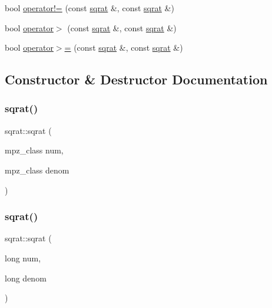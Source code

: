 \begin{DoxyCompactItemize}
\item 
bool \mbox{\hyperlink{classsqrat_ae100dba56606c0cfbbe45c04ae9f462a}{operator!=}} (const \mbox{\hyperlink{classsqrat}{sqrat}} \&, const \mbox{\hyperlink{classsqrat}{sqrat}} \&)
\item 
bool \mbox{\hyperlink{classsqrat_a0a9ebc0afb8356e073d69a69d1450a65}{operator$>$}} (const \mbox{\hyperlink{classsqrat}{sqrat}} \&, const \mbox{\hyperlink{classsqrat}{sqrat}} \&)
\item 
bool \mbox{\hyperlink{classsqrat_adac0450048dc40c698aa22f334e280a1}{operator$>$=}} (const \mbox{\hyperlink{classsqrat}{sqrat}} \&, const \mbox{\hyperlink{classsqrat}{sqrat}} \&)
\end{DoxyCompactItemize}


\subsection{Constructor \& Destructor Documentation}
\mbox{\label{classsqrat_a7c588af79fec6e3765efdd7475418a6a}} 
\subsubsection{\texorpdfstring{sqrat()}{sqrat()}\hspace{0.1cm}{\footnotesize\ttfamily [1/10]}}
{\footnotesize\ttfamily sqrat\+::sqrat (\begin{DoxyParamCaption}\item[{mpz\+\_\+class}]{num,  }\item[{mpz\+\_\+class}]{denom }\end{DoxyParamCaption})}

\mbox{\label{classsqrat_a37c42a6db5d602e438935e2a8396b960}} 
\subsubsection{\texorpdfstring{sqrat()}{sqrat()}\hspace{0.1cm}{\footnotesize\ttfamily [2/10]}}
{\footnotesize\ttfamily sqrat\+::sqrat (\begin{DoxyParamCaption}\item[{long}]{num,  }\item[{long}]{denom }\end{DoxyParamCaption})}

